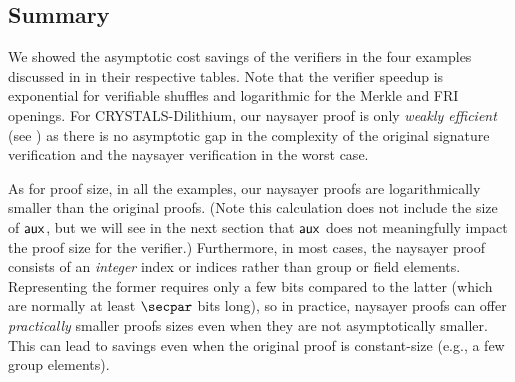 \subsection{Summary}

% 

We showed the asymptotic cost savings of the verifiers in the four examples discussed in  in their respective tables. Note that the verifier speedup is exponential for verifiable shuffles and logarithmic for the Merkle and FRI openings. For CRYSTALS-Dilithium, our naysayer proof is only \emph{weakly efficient} (see ) as there is no asymptotic gap in the complexity of the original signature verification and the naysayer verification in the worst case.

As for proof size, in all the examples, our naysayer proofs are logarithmically smaller than the original proofs.
(Note this calculation does not include the size of $\mathsf{aux}$, but we will see in the next section that $\mathsf{aux}$ does not meaningfully impact the proof size for the verifier.)
Furthermore, in most cases, the naysayer proof consists of an \emph{integer} index or indices rather than group or field elements. Representing the former requires only a few bits compared to the latter (which are normally at least $\secpar$ bits long), so in practice, naysayer proofs can offer \emph{practically} smaller proofs sizes even when they are not asymptotically smaller. This can lead to savings even when the original proof is constant-size (e.g., a few group elements).